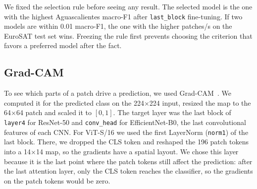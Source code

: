 We fixed the selection rule before seeing any result. The selected model is the one with the
highest Aguascalientes macro-F1 after \texttt{last\_block} fine-tuning. If two models are within
0.01 macro-F1, the one with the higher patches/s on the EuroSAT test set wins. Freezing the
rule first prevents choosing the criterion that favors a preferred model after the fact.

\subsection{Grad-CAM}

To see which parts of a patch drive a prediction, we used Grad-CAM~\cite{selvaraju2017}. We
computed it for the predicted class on the 224$\times$224 input, resized the map to the
64$\times$64 patch and scaled it to $[0, 1]$. The target layer was the last block of
\texttt{layer4} for ResNet-50 and \texttt{conv\_head} for EfficientNet-B0, the last
convolutional features of each CNN. For ViT-S/16 we used the first LayerNorm (\texttt{norm1})
of the last block. There, we dropped the CLS token and reshaped the 196 patch tokens into a
14$\times$14 map, so the gradients have a spatial layout. We chose this layer because it is the
last point where the patch tokens still affect the prediction: after the last attention layer,
only the CLS token reaches the classifier, so the gradients on the patch tokens would be zero.
